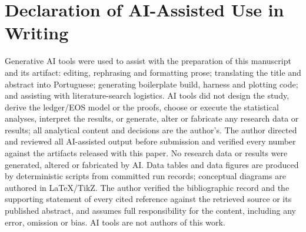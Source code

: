 \documentclass[fleqn,12pt]{SelfArx} %
\theoremstyle{plain}
\theoremstyle{definition}
\begin{document}
\section*{Declaration of AI-Assisted Use in Writing}
Generative AI tools were used to assist with the preparation of this manuscript and its artifact:
editing, rephrasing and formatting prose; translating the title and abstract into Portuguese;
generating boilerplate build, harness and plotting code; and assisting with literature-search
logistics. AI tools did not design the study, derive the ledger/EOS model or the proofs, choose or
execute the statistical analyses, interpret the results, or generate, alter or fabricate any
research data or results; all analytical content and decisions are the author's. The author
directed and reviewed all AI-assisted output before submission and verified every number against
the artifacts released with this paper. No research data or results were generated, altered or
fabricated by AI. Data tables and data figures are produced by deterministic scripts from committed
run records; conceptual diagrams are authored in LaTeX/TikZ. The author verified the bibliographic
record and the supporting statement of every cited reference against the retrieved source or its
published abstract, and assumes full responsibility for the content, including any error, omission
or bias. AI tools are not authors of this work.

\makeatletter
\renewcommand\@biblabel[1]{{\parbox{0.95cm}{[#1]}}}
\makeatother
\renewcommand{\refname}{References}
{\footnotesize}

\balance
\end{document}
